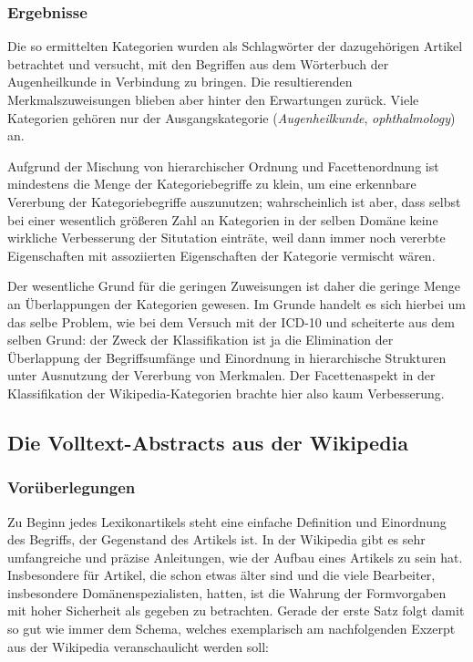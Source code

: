 \documentclass[pagesize,DIV=calc,12pt,draft]{scrreprt}
\begin{document}
\subsubsection{Ergebnisse}

Die so ermittelten Kategorien wurden als Schlagwörter der dazugehörigen Artikel betrachtet und versucht, mit den Begriffen aus dem Wörterbuch der Augenheilkunde in Verbindung zu bringen. 
Die resultierenden Merkmalszuweisungen blieben aber hinter den Erwartungen zurück. 
Viele Kategorien gehören nur der Ausgangskategorie (\emph{Augenheilkunde}, \emph{ophthalmology}) an. 

Aufgrund der Mischung von hierarchischer Ordnung und Facettenordnung ist mindestens die Menge der Kategoriebegriffe zu klein, um eine erkennbare Vererbung der Kategoriebegriffe auszunutzen; wahrscheinlich ist aber, dass selbst bei einer wesentlich größeren Zahl an Kategorien in der selben Domäne keine wirkliche Verbesserung der Situtation einträte, weil dann immer noch vererbte Eigenschaften mit assoziierten Eigenschaften der Kategorie vermischt wären. 

Der wesentliche Grund für die geringen Zuweisungen ist daher die geringe Menge an Überlappungen der Kategorien gewesen. 
Im Grunde handelt es sich hierbei um das selbe Problem, wie bei dem Versuch mit der ICD-10 und scheiterte aus dem selben Grund: der Zweck der Klassifikation ist ja die Elimination der Überlappung der Begriffsumfänge und Einordnung in hierarchische Strukturen unter Ausnutzung der Vererbung von Merkmalen. 
Der Facettenaspekt in der Klassifikation der Wikipedia-Kategorien brachte hier also kaum Verbesserung. 

\subsection{Die Volltext-Abstracts aus der Wikipedia}

\subsubsection{Vorüberlegungen}

Zu Beginn jedes Lexikonartikels steht eine einfache Definition und Einordnung des Begriffs, der Gegenstand des Artikels ist. 
In der Wikipedia gibt es sehr umfangreiche und präzise Anleitungen, wie der Aufbau eines Artikels zu sein hat. 
Insbesondere für Artikel, die schon etwas älter sind und die viele Bearbeiter, insbesondere Domänenspezialisten, hatten, ist die Wahrung der Formvorgaben mit hoher Sicherheit als gegeben zu betrachten. 
Gerade der erste Satz folgt damit so gut wie immer dem Schema, welches exemplarisch am nachfolgenden Exzerpt aus der Wikipedia veranschaulicht werden soll: 
\end{document}
